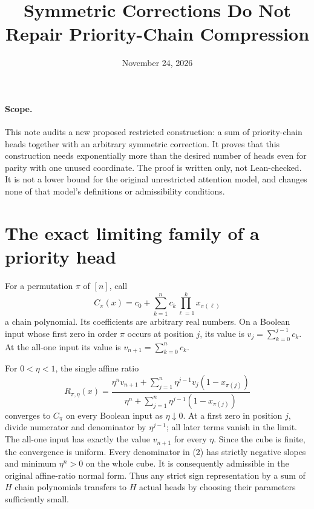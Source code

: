 \documentclass[11pt]{article}
\begin{document}
\title{Symmetric Corrections Do Not Repair Priority-Chain Compression}
\author{}
\date{November 24, 2026}
\maketitle

\paragraph{Scope.}
This note audits a new proposed restricted construction: a sum of
priority-chain heads together with an arbitrary symmetric correction.
It proves that this construction needs exponentially more than the
desired number of heads even for parity with one unused coordinate.
The proof is written only, not Lean-checked. It is not a lower bound
for the original unrestricted attention model, and changes none of
that model's definitions or admissibility conditions.

\section{The exact limiting family of a priority head}

For a permutation $\pi$ of $[n]$, call
\[
 C_\pi(x)=c_0+\sum_{k=1}^n c_k
                              \prod_{\ell=1}^k x_{\pi(\ell)}
                                                        \tag{1}
\]
a chain polynomial. Its coefficients are arbitrary real numbers.
On a Boolean input whose first zero in order $\pi$ occurs at position
$j$, its value is $v_j=\sum_{k=0}^{j-1}c_k$. At the all-one input
its value is $v_{n+1}=\sum_{k=0}^n c_k$.

For $0<\eta<1$, the single affine ratio
\[
 R_{\pi,\eta}(x)=
 \frac{\eta^n v_{n+1}+
       \sum_{j=1}^n\eta^{j-1}v_j(1-x_{\pi(j)})}
      {\eta^n+\sum_{j=1}^n\eta^{j-1}(1-x_{\pi(j)})}
                                                        \tag{2}
\]
converges to $C_\pi$ on every Boolean input as $\eta\downarrow0$.
At a first zero in position $j$, divide numerator and denominator by
$\eta^{j-1}$; all later terms vanish in the limit. The all-one input
has exactly the value $v_{n+1}$ for every $\eta$. Since the cube is
finite, the convergence is uniform. Every denominator in (2) has
strictly negative slopes and minimum $\eta^n>0$ on the whole cube.
It is consequently admissible in the original affine-ratio normal
form. Thus any strict sign representation by a sum of $H$ chain
polynomials transfers to $H$ actual heads by choosing their parameters
sufficiently small.
\end{document}
